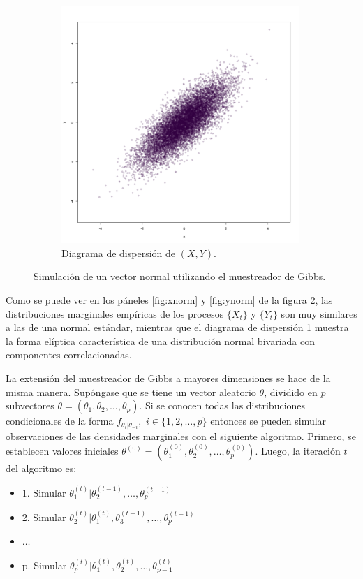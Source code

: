 \documentclass[11pt,a4paper]{article}
\begin{document}
\begin{figure}[!p]
    \vspace{0.2cm}
    \begin{subfigure}[t]{\textwidth}
    \centering
        \includegraphics[width=9cm]{bivnorm.png} 
        \caption{Diagrama de dispersión de $(X, Y)$.} \label{fig:bivnorm}
    \end{subfigure}
    \caption{Simulación de un vector normal utilizando el muestreador de Gibbs.}
    \label{fig:gs_norm}
\end{figure}

Como se puede ver en los páneles \ref{fig:xnorm} y \ref{fig:ynorm} de la figura \ref{fig:gs_norm}, las distribuciones marginales empíricas de los procesos $\lbrace X_t \rbrace$ y $\lbrace Y_t \rbrace$ son muy similares a las de una normal estándar, mientras que el diagrama de dispersión \ref{fig:bivnorm} muestra la forma elíptica característica de una distribución normal bivariada con componentes correlacionadas.

\newpage

La extensión del muestreador de Gibbs a mayores dimensiones se hace de la misma manera. Supóngase que se tiene un vector aleatorio $\theta$, dividido en $p$ subvectores $\theta = (\theta_1, \theta_2, \dots, \theta_p)$. Si se conocen todas las distribuciones condicionales de la forma $f_{\theta_i | \theta_{-i}},$ $i \in \lbrace 1, 2, \dots, p\rbrace$ entonces se pueden simular observaciones de las densidades marginales con el siguiente algoritmo. Primero, se establecen valores iniciales $\theta^{(0)} = (\theta_1^{(0)}, \theta_2^{(0)}, \dots, \theta_p^{(0)})$. Luego, la iteración $t$ del algoritmo es:
\begin{itemize}
\item[] 1. Simular $\theta_1^{(t)} | \theta_2^{(t-1)}, \dots, \theta_p^{(t-1)}$
\item[] 2. Simular $\theta_2^{(t)} | \theta_1^{(t)}, \theta_3^{(t-1)}, \dots, \theta_p^{(t-1)}$
\item[] $\dots$
\item[] p. Simular $\theta_p^{(t)} | \theta_1^{(t)}, \theta_2^{(t)}, \dots, \theta_{p-1}^{(t)}$
\end{itemize}
\end{document}
